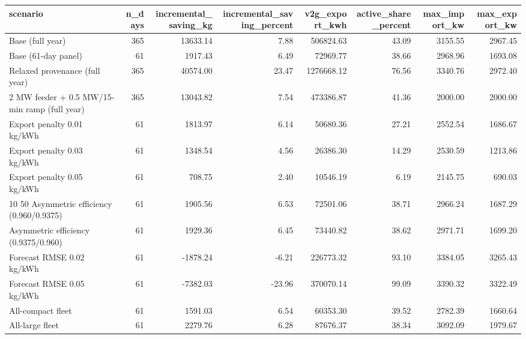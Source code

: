 \begin{tabular}{lrrrrrrr}
\toprule
scenario & n_days & incremental_saving_kg & incremental_saving_percent & v2g_export_kwh & active_share_percent & max_import_kw & max_export_kw \\
\midrule
Base (full year) & 365 & 13633.14 & 7.88 & 506824.63 & 43.09 & 3155.55 & 2967.45 \\
Base (61-day panel) & 61 & 1917.43 & 6.49 & 72969.77 & 38.66 & 2968.96 & 1693.08 \\
Relaxed provenance (full year) & 365 & 40574.00 & 23.47 & 1276668.12 & 76.56 & 3340.76 & 2972.40 \\
2 MW feeder + 0.5 MW/15-min ramp (full year) & 365 & 13043.82 & 7.54 & 473386.87 & 41.36 & 2000.00 & 2000.00 \\
Export penalty 0.01 kg/kWh & 61 & 1813.97 & 6.14 & 50680.36 & 27.21 & 2552.54 & 1686.67 \\
Export penalty 0.03 kg/kWh & 61 & 1348.54 & 4.56 & 26386.30 & 14.29 & 2530.59 & 1213.86 \\
Export penalty 0.05 kg/kWh & 61 & 708.75 & 2.40 & 10546.19 & 6.19 & 2145.75 & 690.03 \\
10%
50%
Asymmetric efficiency (0.960/0.9375) & 61 & 1905.56 & 6.53 & 72501.06 & 38.71 & 2966.24 & 1687.29 \\
Asymmetric efficiency (0.9375/0.960) & 61 & 1929.36 & 6.45 & 73440.82 & 38.62 & 2971.71 & 1699.20 \\
Forecast RMSE 0.02 kg/kWh & 61 & -1878.24 & -6.21 & 226773.32 & 93.10 & 3384.05 & 3265.43 \\
Forecast RMSE 0.05 kg/kWh & 61 & -7382.03 & -23.96 & 370070.14 & 99.09 & 3390.32 & 3322.49 \\
All-compact fleet & 61 & 1591.03 & 6.54 & 60353.30 & 39.52 & 2782.39 & 1660.64 \\
All-large fleet & 61 & 2279.76 & 6.28 & 87676.37 & 38.34 & 3092.09 & 1979.67 \\
\bottomrule
\end{tabular}
